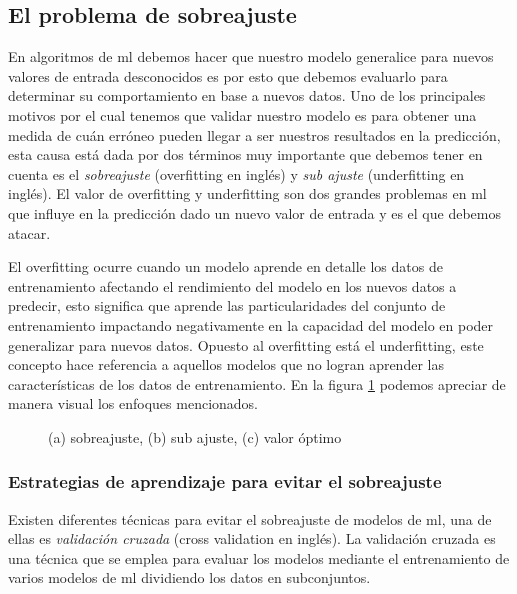 
\subsection{El problema de sobreajuste}\label{sub:validacion-modelo}

En algoritmos de \ac{ml} debemos hacer que nuestro modelo generalice para nuevos valores de entrada desconocidos es por esto que debemos evaluarlo para determinar su comportamiento en base a nuevos datos. Uno de los principales motivos por el cual tenemos que validar nuestro modelo es para obtener una medida de cuán erróneo pueden llegar a ser nuestros resultados en la predicción, esta causa está dada por dos términos muy importante que debemos tener en cuenta es el \textit{sobreajuste} (overfitting en inglés) y \textit{sub ajuste} (underfitting en inglés). El valor de overfitting y underfitting son dos grandes problemas en \ac{ml} que influye en la predicción dado un nuevo valor de entrada y es el que debemos atacar. 

El overfitting ocurre cuando un modelo aprende en detalle los datos de entrenamiento afectando el rendimiento del modelo en los nuevos datos a predecir, esto significa que aprende las particularidades del conjunto de entrenamiento impactando negativamente en la capacidad del modelo en poder generalizar para nuevos datos. Opuesto al overfitting está el  underfitting, este concepto hace referencia a aquellos modelos que no logran aprender las características de los datos de entrenamiento. En la figura \ref{Fig:overUnder} podemos apreciar de manera visual los enfoques mencionados.

\begin{figure}[htbp]
\centering
{}
\caption{(a) sobreajuste, (b) sub ajuste, (c) valor óptimo}\label{Fig:overUnder}
\end{figure}


\subsubsection{Estrategias de aprendizaje para evitar el sobreajuste}

Existen diferentes técnicas para evitar el sobreajuste de modelos de \ac{ml}, una de ellas es \textit{validación cruzada} (cross validation en inglés). La validación cruzada es una técnica que se emplea para evaluar los modelos mediante el entrenamiento de varios modelos de  \ac{ml} dividiendo los datos en subconjuntos.

